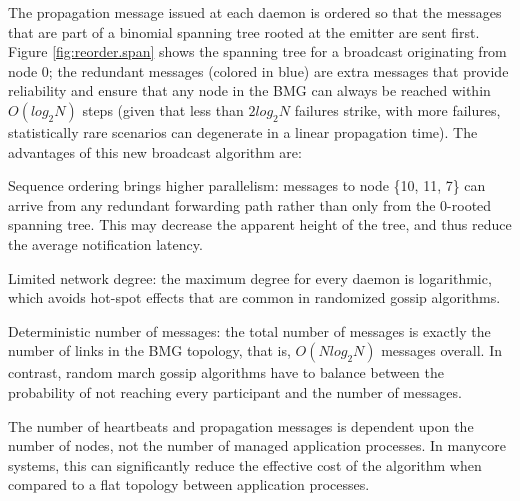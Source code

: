 \documentclass[5p,times,twocolumn]{elsarticle}
\begin{document}
The propagation message issued at each daemon is ordered so that the
messages that are part of a binomial spanning tree rooted at the emitter
are sent first. Figure \ref{fig:reorder.span} shows the spanning tree
for a broadcast originating from node 0; the redundant messages (colored
in blue) are extra messages that provide reliability and ensure that
any node in the BMG can always be reached within $O(log_2 N)$ steps (given
that less than $2 log_2 N$ failures strike, with more failures,
statistically rare scenarios can degenerate in a linear propagation time).
The advantages of this new broadcast algorithm are:
\begin{compactenum}
  \item Sequence ordering brings higher parallelism: messages to node \{10, 11, 7\} can arrive from any redundant forwarding path rather than only from the 0-rooted spanning tree. This may decrease the apparent height of the tree, and thus reduce the average notification latency.
  \item Limited network degree: the maximum degree for every daemon is logarithmic, which avoids hot-spot effects that are common in randomized gossip algorithms.
  \item Deterministic number of messages: the total number of messages is
  exactly the number of links in the BMG topology, that is, $O(N log_2 N)$
  messages overall. In contrast, random march gossip algorithms have to
  balance between the probability of not reaching every participant and
  the number of messages.
  \item The number of heartbeats and propagation messages is dependent upon
  the number of nodes, not the number of managed application processes.
  In manycore systems, this can significantly reduce the
  effective cost of the algorithm when compared to a flat topology between
  application processes.
\end{compactenum}
\end{document}
